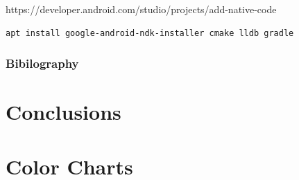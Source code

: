 \documentclass[a4paper, 11pt]{report}
\begin{document}
https://developer.android.com/studio/projects/add-native-code

\begin{verbatim}
apt install google-android-ndk-installer cmake lldb gradle
\end{verbatim}

\hypertarget{bibilography-1}{%
\subsection{Bibilography}\label{bibilography-1}}

\chapter{Conclusions}




\appendix



\chapter{Color Charts}
\end{document}
